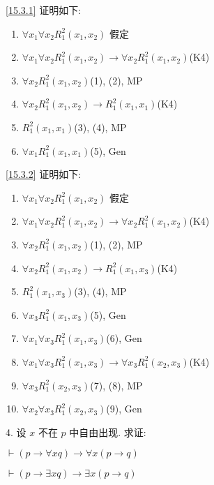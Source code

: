 \documentclass[boxes]{homework}
\begin{document}
\begin{solution}
    \ref{15.3.1} 证明如下:
    \begin{enumerate}[label = (\arabic*), itemsep = 0em, topsep = .5em, partopsep = .5em]
        \item $\forall x_1\forall x_2 R_1^2(x_1, x_2)$ \hfill 假定
        \item $\forall x_1\forall x_2 R_1^2(x_1, x_2)\to \forall x_2 R_1^2(x_1, x_2)$\hfill (K4)
        \item $\forall x_2 R_1^2(x_1, x_2)$\hfill (1), (2), MP
        \item $\forall x_2 R_1^2(x_1, x_2)\to R_1^2(x_1, x_1)$\hfill (K4)
        \item $R_1^2(x_1, x_1)$\hfill (3), (4), MP
        \item $\forall x_1 R_1^2(x_1, x_1)$\hfill (5), Gen
    \end{enumerate}
    \ref{15.3.2} 证明如下:
    \begin{enumerate}[label = (\arabic*), itemsep = 0em, topsep = .5em, partopsep = .5em]
        \item $\forall x_1\forall x_2 R_1^2(x_1, x_2)$ \hfill 假定
        \item $\forall x_1\forall x_2 R_1^2(x_1, x_2)\to \forall x_2 R_1^2(x_1, x_2)$\hfill (K4)
        \item $\forall x_2 R_1^2(x_1, x_2)$\hfill (1), (2), MP
        \item $\forall x_2 R_1^2(x_1, x_2)\to R_1^2(x_1, x_3)$\hfill (K4)
        \item $R_1^2(x_1, x_3)$\hfill (3), (4), MP
        \item $\forall x_3 R_1^2(x_1, x_3)$\hfill (5), Gen
        \item $\forall x_1\forall x_3 R_1^2(x_1, x_3)$\hfill (6), Gen
        \item $\forall x_1\forall x_3 R_1^2(x_1, x_3)\to \forall x_3 R_1^2(x_2, x_3)$\hfill (K4)
        \item $\forall x_3 R_1^2(x_2, x_3)$\hfill (7), (8), MP
        \item $\forall x_2\forall x_3 R_1^2(x_2, x_3)$\hfill (9), Gen
    \end{enumerate}
\end{solution}
\begin{problem}
4. 设 $x$ 不在 $p$ 中自由出现. 求证:
\begin{parts}[n]
    \item \label{15.4.1} $\vdash (p\to \forall xq)\to \forall x(p\to q)$
    \item \label{15.4.2} $\vdash (p\to \exists xq)\to \exists x(p\to q)$
\end{parts}
\end{problem}
\end{document}
